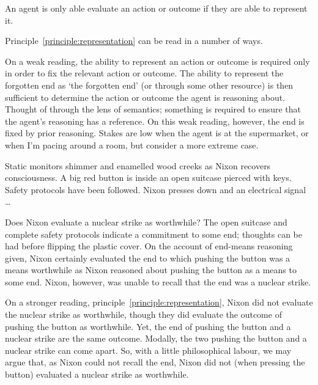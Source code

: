 \documentclass[10pt]{article}
\begin{document}
\begin{principle}\label{principle:representation}
  An agent is only able evaluate an action or outcome if they are able to represent it.
\end{principle}

Principle~\ref{principle:representation} can be read in a number of ways.

On a weak reading, the ability to represent an action or outcome is required only in order to fix the relevant action or outcome.
The ability to represent the forgotten end as `the forgotten end' (or through some other resource) is then sufficient to determine the action or outcome the agent is reasoning about.
Thought of through the lens of semantics; something is required to ensure that the agent's reasoning has a reference.
On this weak reading, however, the end is fixed by prior reasoning.
Stakes are low when the agent is at the supermarket, or when I'm pacing around a room, but consider a more extreme case.

\begin{scenario}
  Static monitors shimmer and enamelled wood creeks as Nixon recovers consciousness.
  A big red button is inside an open suitcase pierced with keys.
  Safety protocols have been followed.
  Nixon presses down and an electrical signal \dots
\end{scenario}


Does Nixon evaluate a nuclear strike as worthwhile?
The open suitcase and complete safety protocols indicate a commitment to some end; thoughts can be had before flipping the plastic cover.
On the account of end-means reasoning given, Nixon certainly evaluated the end to which pushing the button was a means worthwhile as Nixon reasoned about pushing the button as a means to some end.
Nixon, however, was unable to recall that the end was a nuclear strike.

On a stronger reading, principle~\ref{principle:representation}, Nixon did not evaluate the nuclear strike as worthwhile, though they did evaluate the outcome of pushing the button as worthwhile.
Yet, the end of pushing the button and a nuclear strike are the same outcome.
Modally, the two pushing the button and a nuclear strike can come apart.
So, with a little philosophical labour, we may argue that, as Nixon could not recall the end, Nixon did not (when pressing the button) evaluated a nuclear strike as worthwhile.
\end{document}
